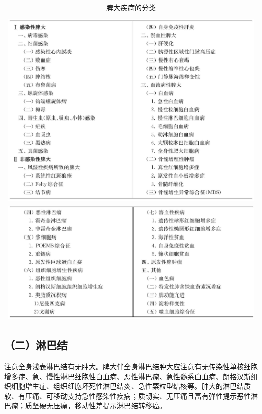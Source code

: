 \begin{longtable}{c}
 \caption{脾大疾病的分类}
 \label{tab31-1}
 \endfirsthead
 \caption[]{脾大疾病的分类}
 \endhead
 \includegraphics[width=\textwidth,height=\textheight,keepaspectratio]{./images/Image00159.jpg}\\
 \includegraphics[width=\textwidth,height=\textheight,keepaspectratio]{./images/Image00160.jpg}
 \end{longtable}

\subsection{（二）淋巴结}

注意全身浅表淋巴结有无肿大。脾大伴全身淋巴结肿大应注意有无传染性单核细胞增多症、急、慢性淋巴细胞性白血病、恶性淋巴瘤、急性髓系白血病、朗格汉斯组织细胞增生症、组织细胞坏死性淋巴结炎、急性粟粒型结核等。肿大的淋巴结质软、有压痛、可移动支持急性感染性疾病；质韧实、无压痛且富有弹性提示恶性淋巴瘤；质坚硬无压痛，移动性差提示淋巴结转移癌。

